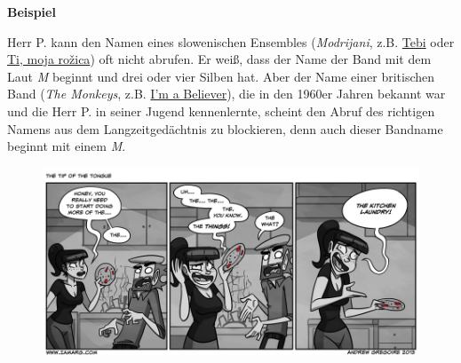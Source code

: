\documentclass[
  letterpaper,
]{scrbook}
\begin{document}
\begin{tcolorbox}[enhanced jigsaw, rightrule=.15mm, arc=.35mm, breakable, colframe=quarto-callout-note-color-frame, left=2mm, colback=white, bottomrule=.15mm, toprule=.15mm, leftrule=.75mm, opacityback=0]
\begin{minipage}[t]{5.5mm}
\textcolor{quarto-callout-note-color}{\faInfo}
\end{minipage}%
\begin{minipage}[t]{\textwidth - 5.5mm}

\textbf{Beispiel}\vspace{2mm}

Herr P. kann den Namen eines slowenischen Ensembles (\emph{Modrijani},
z.B. \href{https://www.youtube.com/watch?v=a7pcqxKHb_E}{Tebi} oder
\href{https://www.youtube.com/watch?v=RuiBoAWfSJE}{Ti, moja rožica}) oft
nicht abrufen. Er weiß, dass der Name der Band mit dem Laut \emph{M}
beginnt und drei oder vier Silben hat. Aber der Name einer britischen
Band (\emph{The Monkeys}, z.B.
\href{https://www.google.com/search?client=firefox-b-d\&q=the+monkeys\#fpstate=ive\&vld=cid:38a2b68e,vid:wB9YIsKIEbA,st:0}{I'm
a Believer}), die in den 1960er Jahren bekannt war und die Herr P. in
seiner Jugend kennenlernte, scheint den Abruf des richtigen Namens aus
dem Langzeitgedächtnis zu blockieren, denn auch dieser Bandname beginnt
mit einem \emph{M}.

\end{minipage}%
\end{tcolorbox}

\begin{figure}

{\centering 

\href{https://www.deviantart.com/iamarg/art/The-Tip-of-the-Tongue-414103082}{\includegraphics[width=1\textwidth,height=\textheight]{./pictures/d6ujnze-d76188d2-5723-46fc-933e-afe0459b1d08.jpg}}

}

\end{figure}
\end{document}
